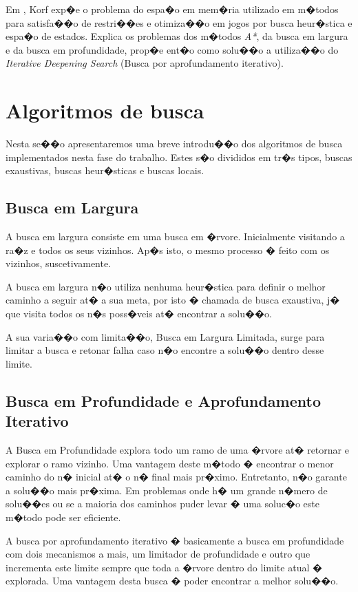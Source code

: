 \documentclass[12pt]{article}
\begin{document}
Em \cite{korf95acm}, Korf exp�e o problema do espa�o em mem�ria utilizado em m�todos para satisfa��o de restri��es e otimiza��o em jogos por busca heur�stica e espa�o de estados. Explica os problemas dos m�todos \textit{A*}, da busca em largura e da busca em profundidade, prop�e ent�o como solu��o a utiliza��o do \textit{Iterative Deepening Search} (Busca por aprofundamento iterativo).

\section{Algoritmos de busca}

Nesta se��o apresentaremos uma breve introdu��o dos algoritmos de busca implementados nesta fase do trabalho. Estes s�o divididos em tr�s tipos, buscas exaustivas, buscas heur�sticas e buscas locais.

\subsection{Busca em Largura}

A busca em largura consiste em uma busca em �rvore. Inicialmente visitando a ra�z e todos os seus vizinhos. Ap�s isto, o mesmo processo � feito com os vizinhos, suscetivamente.

A busca em largura n�o utiliza nenhuma heur�stica para definir o melhor caminho a seguir at� a sua meta, por isto � chamada de busca exaustiva, j� que visita todos os n�s poss�veis at� encontrar a solu��o.

A sua varia��o com limita��o, Busca em Largura Limitada, surge para limitar a busca e retonar falha caso n�o encontre a solu��o dentro desse limite.

\subsection{Busca em Profundidade e Aprofundamento Iterativo}

A Busca em Profundidade explora todo um ramo de uma �rvore at� retornar e explorar o ramo vizinho. Uma vantagem deste m�todo � encontrar o menor caminho do n� inicial at� o n� final mais pr�ximo. Entretanto, n�o garante a solu��o mais pr�xima. Em problemas onde h� um grande n�mero de solu��es ou se a maioria dos caminhos puder levar � uma soluc�o este m�todo pode ser eficiente.

A busca por aprofundamento iterativo � basicamente a busca em profundidade com dois mecanismos a mais, um limitador de profundidade e outro que incrementa este limite sempre que toda a �rvore dentro do limite atual � explorada. Uma vantagem desta busca � poder encontrar a melhor solu��o.
\end{document}
